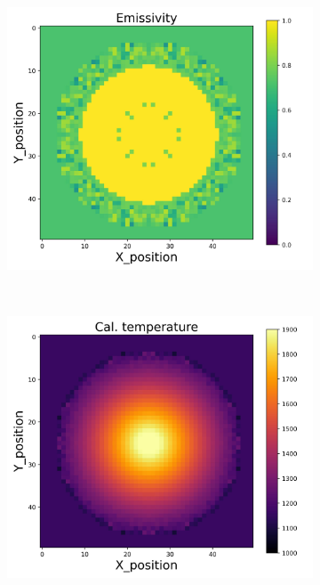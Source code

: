 \begin{figure}[htbp]
\begin{minipage}{\textwidth}
\begin{subfigure}{0.325\textwidth}
        \end{subfigure}
        \begin{subfigure}{0.325\textwidth}
            \centering
            \includegraphics[width=\textwidth]{figures/raw_data/0/mix/emi_cal.jpg}
        \end{subfigure}
    \end{minipage}\\
    \begin{minipage}{\textwidth}
        \centering
        \begin{subfigure}{0.325\textwidth}
            \centering
            \includegraphics[width=\textwidth]{figures/raw_data/21/mix/T_cal.jpg}

\end{subfigure}
\end{minipage}
\end{figure}
